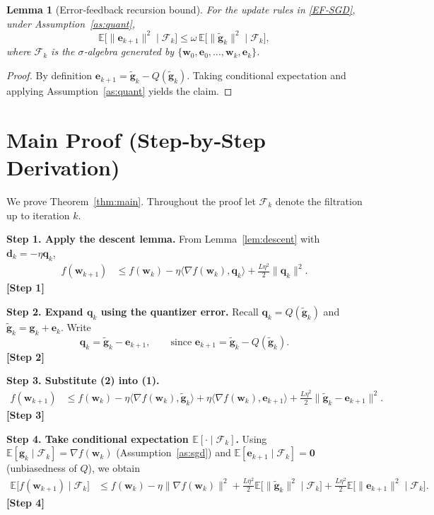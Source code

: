 \documentclass{article}
\newtheorem{lemma}{Lemma}
\newcommand{\E}{\mathbb{E}}
\newcommand{\ip}[2]{\langle #1,#2\rangle}
\begin{document}
\begin{lemma}[Error‑feedback recursion bound]\label{lem:error}
For the update rules in \eqref{EF‑SGD}, under Assumption~\ref{as:quant},
\[
\E\!\big[\|\bm e_{k+1}\|^2\mid\mathcal F_k\big]\le
\omega \,\E\!\big[\|\tilde{\bm g}_k\|^2\mid\mathcal F_k\big],
\]
where $\mathcal F_k$ is the $\sigma$‑algebra generated by $\{\bm w_0,\bm e_0,\dots,\bm w_k,\bm e_k\}$.
\end{lemma}
\begin{proof}
By definition $\bm e_{k+1}= \tilde{\bm g}_k- Q(\tilde{\bm g}_k)$. Taking conditional expectation and applying Assumption~\ref{as:quant} yields the claim. \qedhere
\end{proof}

\section*{Main Proof (Step‑by‑Step Derivation)}
We prove Theorem~\ref{thm:main}. Throughout the proof let $\mathcal F_k$ denote the filtration up to iteration $k$.

\noindent\textbf{Step 1. Apply the descent lemma.}  
From Lemma~\ref{lem:descent} with $\bm d_k = -\eta \bm q_k$,
\begin{align}
f(\bm w_{k+1})
&\le f(\bm w_k) - \eta\ip{\nabla f(\bm w_k)}{\bm q_k}
    +\frac{L\eta^2}{2}\|\bm q_k\|^2 .
\tag{1}
\end{align}
\textbf{[Step 1]}

\noindent\textbf{Step 2. Expand $\bm q_k$ using the quantizer error.}  
Recall $\bm q_k = Q(\tilde{\bm g}_k)$ and $\tilde{\bm g}_k = \bm g_k + \bm e_k$. Write
\[
\bm q_k = \tilde{\bm g}_k - \bm e_{k+1},
\qquad\text{since }\bm e_{k+1}= \tilde{\bm g}_k- Q(\tilde{\bm g}_k).
\tag{2}
\]
\textbf{[Step 2]}

\noindent\textbf{Step 3. Substitute (2) into (1).}
\begin{align}
f(\bm w_{k+1})
&\le f(\bm w_k) -\eta\ip{\nabla f(\bm w_k)}{\tilde{\bm g}_k}
      +\eta\ip{\nabla f(\bm w_k)}{\bm e_{k+1}}
      +\frac{L\eta^2}{2}\|\tilde{\bm g}_k-\bm e_{k+1}\|^2 .
\tag{3}
\end{align}
\textbf{[Step 3]}

\noindent\textbf{Step 4. Take conditional expectation $\E[\cdot\mid\mathcal F_k]$.}  
Using $\E[\bm g_k\mid\mathcal F_k]=\nabla f(\bm w_k)$ (Assumption~\ref{as:sgd}) and $\E[\bm e_{k+1}\mid\mathcal F_k]=\bm 0$ (unbiasedness of $Q$), we obtain
\begin{align}
\E\!\big[f(\bm w_{k+1})\mid\mathcal F_k\big]
&\le f(\bm w_k) -\eta\|\nabla f(\bm w_k)\|^2
    +\frac{L\eta^2}{2}\E\!\big[\|\tilde{\bm g}_k\|^2\mid\mathcal F_k\big]
    +\frac{L\eta^2}{2}\E\!\big[\|\bm e_{k+1}\|^2\mid\mathcal F_k\big] .
\tag{4}
\end{align}
\textbf{[Step 4]}
\end{document}

